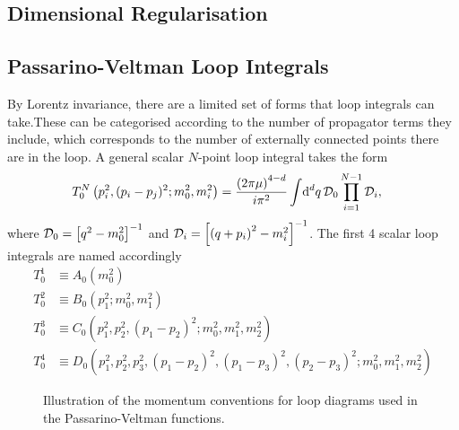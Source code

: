 \documentclass[../main.tex]{subfiles}
\begin{document}
\subsection{Dimensional Regularisation}




\subsection{Passarino-Veltman Loop Integrals}
By Lorentz invariance, there are a limited set of forms that loop integrals
can
take. These can be categorised according to the number
of propagator terms they include, which corresponds to the number of externally
connected points there are in the loop. A general scalar \(N\)-point loop
integral takes the form
\begin{align}
  T^N_0\left(p_i^2, (p_i-p_j)^2; m_0^2, m_i^2\right) & = \frac{\left(2\pi
      \mu\right)^{4-d}}{i \pi^2} \int \!\mathrm{d}^d q\, \mathcal{D}_0
  \prod_{i=1}^{N-1}
  \mathcal{D}_i,
\end{align}
where \(\mathcal{D}_0 = \left[q^2-m_0^2\right]^{-1}\) and \(\mathcal{D}_i =
\left[\left(q+p_i\right)^2-m_i^2\right]^{-1}\).
The first 4 scalar loop integrals are named accordingly
\begin{align}
  T^1_0 & \equiv A_0(m_0^2)
  \\
  T^2_0 & \equiv B_0(p_1^2; m_0^2, m_1^2)
  \\
  T^3_0 & \equiv C_0(p_1^2, p_2^2, (p_1-p_2)^2; m_0^2, m_1^2, m_2^2)
  \\
  T^4_0 & \equiv D_0(p_1^2, p_2^2, p_3^2, (p_1-p_2)^2, (p_1-p_3)^2,
  (p_2-p_3)^2; m_0^2, m_1^2, m_2^2)
\end{align}

\begin{figure}[ht!]
  \centering
  \begin{subfigure}{0.49\linewidth}
    \centering
    \caption{}
    \label{qft:fig:PV_triloop_conventions}
  \end{subfigure}
  \begin{subfigure}{0.49\linewidth}
    \centering
    \caption{}
    \label{qft:fig:PV_boxloop_conventions}
  \end{subfigure}
  \caption{Illustration of the momentum conventions for loop diagrams used in
    the Passarino-Veltman functions.}
  \label{qft:fig:PV_loop_conventions}
\end{figure}
\end{document}

